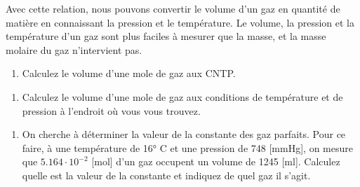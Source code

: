 \documentclass[
  11pt,
  a4paper,
  openany]{book}
\providecommand{\tightlist}{%
  \setlength{\itemsep}{0pt}\setlength{\parskip}{0pt}}
\begin{document}
Avec cette relation, nous pouvons convertir le volume d'un gaz en quantité de matière en connaissant la pression et le température. Le volume, la pression et la température d'un gaz sont plus faciles à mesurer que la masse, et la masse molaire du gaz n'intervient pas.

\begin{Exercise}

\begin{enumerate}
\def\labelenumi{\arabic{enumi}.}
\tightlist
\item
  Calculez le volume d'une mole de gaz aux CNTP.
\end{enumerate}


\begin{enumerate}
\def\labelenumi{\arabic{enumi}.}
\setcounter{enumi}{1}
\tightlist
\item
  Calculez le volume d'une mole de gaz aux conditions de température et de pression à l'endroit où vous vous trouvez.
\end{enumerate}


\begin{enumerate}
\def\labelenumi{\arabic{enumi}.}
\setcounter{enumi}{2}
\tightlist
\item
  On cherche à déterminer la valeur de la constante des gaz parfaits. Pour ce faire, à une température de 16° C et une pression de 748 {[}mmHg{]}, on mesure que \(5.164 \cdot 10^{-2}\) {[}mol{]} d'un gaz occupent un volume de 1245 {[}ml{]}. Calculez quelle est la valeur de la constante et indiquez de quel gaz il s'agit.
\end{enumerate}


\end{Exercise}
\end{document}
